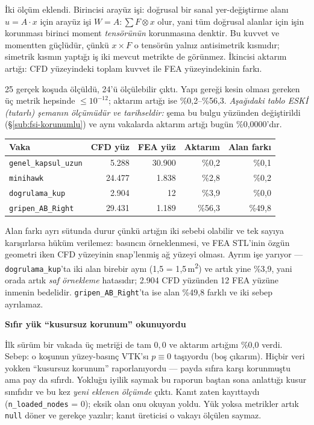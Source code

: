 \documentclass[11pt,a4paper]{article}
\newcommand{\kkkenar}{lacivert}
\newcommand{\kkzemin}{kod}
\newenvironment{renkkutu}[3]{%
  \renewcommand{\kkkenar}{#1}\renewcommand{\kkzemin}{#2}%
  \par\medskip\noindent
  \begin{lrbox}{\kutugovde}%
  \begin{minipage}{\dimexpr\linewidth-2\fboxsep-2\fboxrule\relax}\footnotesize
  \textcolor{#1}{\textbf{#3}}\par\vspace{3pt}%
}{%
  \end{minipage}%
  \end{lrbox}%
  \noindent\fcolorbox{\kkkenar}{\kkzemin}{\usebox{\kutugovde}}%
  \par\medskip
}
\newenvironment{dikkat}[1]{\begin{renkkutu}{orta}{ortabg}{#1}}{\end{renkkutu}}
\begin{document}
İki ölçüm eklendi. Birincisi arayüz işi: doğrusal bir sanal yer-değiştirme
alanı $u = A\!\cdot\!x$ için arayüz işi $W = A : \sum F\otimes x$ olur, yani
tüm doğrusal alanlar için işin korunması birinci moment \emph{tensörünün}
korunmasına denktir. Bu kuvvet ve momentten güçlüdür, çünkü $x\times F$ o
tensörün yalnız antisimetrik kısmıdır; simetrik kısmın yaptığı iş iki mevcut
metrikte de görünmez. İkincisi aktarım artığı: CFD yüzeyindeki toplam kuvvet
ile FEA yüzeyindekinin farkı.

25 gerçek koşuda ölçüldü, 24'ü ölçülebilir çıktı. Yapı gereği kesin
olması gereken üç metrik hepsinde $\le\!10^{-12}$; aktarım artığı
ise \%0{,}2--\%56{,}3.
\emph{Aşağıdaki tablo ESKİ (tutarlı) şemanın ölçümüdür ve tarihseldir:}
şema bu bulgu yüzünden değiştirildi
(\S\ref{sub:fsi-korunumlu}) ve aynı
vakalarda aktarım artığı bugün \%0{,}0000'dır.

\begin{center}\footnotesize
\begin{tabular}{@{}lrrrr@{}}
\toprule
Vaka & CFD yüz & FEA yüz & Aktarım & Alan farkı \\
\midrule
\texttt{genel\_kapsul\_uzun} & 5.288 & 30.900 & \%0{,}2 & \%0{,}1 \\
\texttt{minihawk} & 24.477 & 1.838 & \%2{,}8 & \%0{,}2 \\
\texttt{dogrulama\_kup} & 2.904 & 12 & \%3{,}9 & \%0{,}0 \\
\texttt{gripen\_AB\_Right} & 29.431 & 1.189 & \%56{,}3 & \%49{,}8 \\
\bottomrule
\end{tabular}
\end{center}

\noindent Alan farkı ayrı sütunda durur çünkü artığın iki sebebi olabilir ve
tek sayıya karışırlarsa hüküm verilemez: basıncın örneklenmesi, ve FEA
STL'inin özgün geometri iken CFD yüzeyinin snap'lenmiş ağ yüzeyi olması.
Ayrım işe yarıyor --- \texttt{dogrulama\_kup}'ta iki alan birebir aynı
(1{,}5 = 1{,}5\,m\textsuperscript{2}) ve artık yine \%3{,}9, yani orada artık
\emph{saf örnekleme} hatasıdır; 2.904 CFD yüzünden 12 FEA yüzüne inmenin
bedelidir. \texttt{gripen\_AB\_Right}'ta ise alan \%49{,}8 farklı ve iki sebep
ayrılamaz.

\begin{dikkat}{Sıfır yük ``kusursuz korunum'' okunuyordu}
İlk sürüm bir vakada üç metriği de tam $0{,}0$ ve aktarım artığını \%0{,}0
verdi. Sebep: o koşunun yüzey-basınç VTK'sı $p\equiv 0$ taşıyordu (boş
çıkarım). Hiçbir veri yokken ``kusursuz korunum'' raporlanıyordu --- payda
sıfıra karşı korunmuştu ama pay da sıfırdı. Yokluğu iyilik saymak bu raporun
baştan sona anlattığı kusur sınıfıdır ve bu kez \emph{yeni eklenen ölçümde}
çıktı. Kanıt zaten kayıttaydı (\texttt{n\_loaded\_nodes} = 0); eksik olan onu
okuyan yoldu. Yük yoksa metrikler artık \texttt{null} döner ve gerekçe
yazılır; kanıt üreticisi o vakayı ölçülen saymaz.
\end{dikkat}
\end{document}
